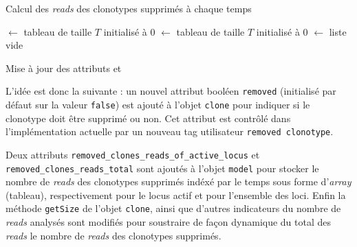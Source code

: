 \begin{algorithm}[H]
    \caption{Calcul des \textit{reads} des clonotypes supprimés à chaque temps}
    \label{algo:removed-reads}


    \RemovedReadsLocus $\leftarrow$ tableau de taille $T$ initialisé à $0$\;
    \RemovedReadsTotal $\leftarrow$ tableau de taille $T$ initialisé à $0$\;
    \Germline $\leftarrow$ liste vide\;



    Mise à jour des attributs \RemovedReadsLocus et \RemovedReadsTotal\
\end{algorithm}

L'idée est donc la suivante : un nouvel attribut booléen \texttt{removed}
(initialisé par défaut sur la valeur \texttt{false}) est ajouté à l'objet
\texttt{clone} pour indiquer si le clonotype doit être supprimé ou non. Cet
attribut est contrôlé dans l'implémentation actuelle par un nouveau tag
utilisateur \texttt{removed\ clonotype}. 

Deux attributs \texttt{removed\_clones\_reads\_of\_active\_locus} et
\texttt{removed\_clones\_reads\_total} sont ajoutés à l'objet \texttt{model}
pour stocker le nombre de \textit{reads} des clonotypes supprimés indéxé par le
temps sous forme d'\textit{array} (tableau), respectivement pour le locus actif
et pour l'ensemble des loci. Enfin la méthode
\texttt{getSize} de l'objet \texttt{clone}, ainsi que d'autres indicateurs du
nombre de \textit{reads} analysés sont modifiés pour soustraire de façon dynamique
du total des \textit{reads} le nombre de \textit{reads} des clonotypes supprimés.

